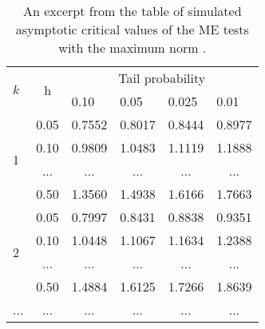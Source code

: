 \documentclass[main.tex]{subfiles}
\begin{document}
\begin{table}[]
\centering
\begin{tabular}{|l|l|l|l|l|l|}
\hline
\multirow{2}{*}{$k$}        & \multicolumn{1}{c|}{\multirow{2}{*}{h}} & \multicolumn{4}{c|}{Tail probability}                                                                     \\ \cline{3-6} 
                          & \multicolumn{1}{c|}{}                   & 0.10                     & 0.05                     & 0.025                    & 0.01                     \\ \hline
\multirow{4}{*}{1}        & 0.05                                    & 0.7552                   & 0.8017                   & 0.8444                   & 0.8977                   \\ \cline{2-6} 
                          & 0.10                                    & 0.9809                   & 1.0483                   & 1.1119                   & 1.1888                   \\ \cline{2-6} 
                          & \multicolumn{1}{c|}{...}                & \multicolumn{1}{c|}{...} & \multicolumn{1}{c|}{...} & \multicolumn{1}{c|}{...} & \multicolumn{1}{c|}{...} \\ \cline{2-6} 
                          & 0.50                                    & 1.3560                   & 1.4938                   & 1.6166                   & 1.7663                   \\ \hline
\multirow{4}{*}{2}        & 0.05                                    & 0.7997                   & 0.8431                   & 0.8838                   & 0.9351                   \\ \cline{2-6} 
                          & 0.10                                    & 1.0448                   & 1.1067                   & 1.1634                   & 1.2388                   \\ \cline{2-6} 
                          & \multicolumn{1}{c|}{...}                & \multicolumn{1}{c|}{...} & \multicolumn{1}{c|}{...} & \multicolumn{1}{c|}{...} & \multicolumn{1}{c|}{...} \\ \cline{2-6} 
                          & 0.50                                    & 1.4884                   & 1.6125                   & 1.7266                   & 1.8639                   \\ \hline
\multicolumn{1}{|c|}{...} & \multicolumn{1}{c|}{...}                & \multicolumn{1}{c|}{...} & \multicolumn{1}{c|}{...} & \multicolumn{1}{c|}{...} & \multicolumn{1}{c|}{...} \\ \hline
\end{tabular}
\caption{An excerpt from the table of simulated asymptotic critical values of the
  ME tests with the maximum norm \cite{moving_estimate_test}.}
\label{table:critvals}
\end{table}
\end{document}
